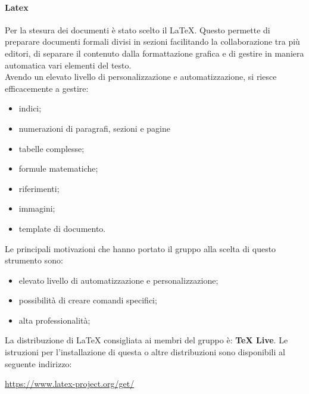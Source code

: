 		\paragraph{Latex}
		Per la stesura dei documenti è stato scelto il  \LaTeX{}. Questo permette di preparare documenti formali divisi in sezioni facilitando la collaborazione tra più editori, di separare il contenuto dalla formattazione grafica e di gestire in maniera automatica vari elementi del testo. \\
		Avendo un elevato livello di personalizzazione e automatizzazione, si riesce efficacemente a gestire: 
		\begin{itemize}
			\item indici;
			\item numerazioni di paragrafi, sezioni e pagine
			\item tabelle complesse;
			\item formule matematiche;
			\item riferimenti;
			\item immagini;
			\item template di documento.
		\end{itemize}
		Le principali motivazioni che hanno portato il gruppo alla scelta di questo strumento sono:
		\begin{itemize}
			\item elevato livello di automatizzazione e personalizzazione;
			\item possibilità di creare comandi specifici;
			\item alta professionalità;
		\end{itemize}
		La distribuzione di \LaTeX{} consigliata ai membri del gruppo è: \textbf{TeX Live}. Le istruzioni per l'installazione di questa o altre distribuzioni sono disponibili al seguente indirizzo:
		\begin{center}
			\url{https://www.latex-project.org/get/}
		\end{center}
